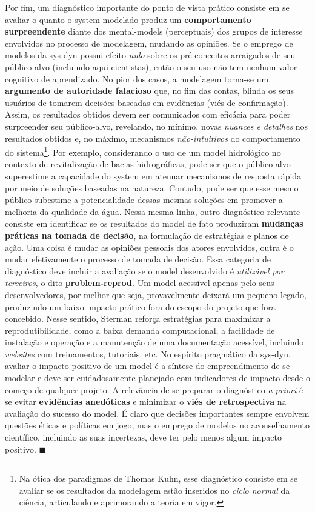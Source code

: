 \documentclass[./main.tex]{subfiles}
\begin{document}
\par Por fim, um diagnóstico importante do ponto de vista prático consiste em se avaliar o quanto o \gls{system} modelado produz um \textbf{comportamento surpreendente} diante dos \gls{mental-models} (perceptuais) dos grupos de interesse envolvidos no processo de modelagem, mudando as opiniões. Se o emprego de modelos da \gls{sys-dyn} possui efeito \textit{nulo} sobre os pré-conceitos arraigados de seu público-alvo (incluindo aqui cientistas), então o seu uso não tem nenhum valor cognitivo de aprendizado. No pior dos casos, a modelagem torna-se um \textbf{argumento de autoridade falacioso} que, no fim das contas, blinda os seus usuários de tomarem decisões baseadas em evidências (viés de confirmação). Assim, os resultados obtidos devem ser comunicados com eficácia para poder surpreender seu público-alvo, revelando, no mínimo, novas \textit{nuances e detalhes} nos resultados obtidos e, no máximo, mecanismos \textit{não-intuitivos} do comportamento do sistema\footnote{Na ótica dos paradigmas de Thomas Kuhn, esse diagnóstico consiste em se avaliar se os resultados da modelagem estão inseridos no \textit{ciclo normal} da ciência, articulando e aprimorando a \gls{teoria} em vigor.}. Por exemplo, considerando o uso de um \gls{model} hidrológico no contexto de revitalização de bacias hidrográficas, pode ser que o público-alvo superestime a capacidade do \gls{system} em atenuar mecanismos de resposta rápida por meio de soluções baseadas na natureza. Contudo, pode ser que esse mesmo público subestime a potencialidade dessas mesmas soluções em promover a melhoria da qualidade da água. Nessa mesma linha, outro diagnóstico relevante consiste em identificar se os resultados do \gls{model} de fato produziram \textbf{mudanças práticas na tomada de decisão}, na formulação de estratégias e planos de ação. Uma coisa é mudar as opiniões pessoais dos atores envolvidos, outra é o mudar efetivamente o processo de tomada de decisão. Essa categoria de diagnóstico deve incluir a avaliação se o \gls{model} desenvolvido é \textit{utilizável por terceiros}, o dito \textbf{\gls{problem-reprod}}.  Um \gls{model} acessível apenas pelo seus desenvolvedores, por melhor que seja, provavelmente deixará um pequeno legado, produzindo um baixo impacto prático fora do escopo do projeto que fora concebido. Nesse sentido, Sterman reforça estratégias para maximizar a reprodutibilidade, como a baixa demanda computacional, a facilidade de instalação e operação e a manutenção de uma documentação acessível, incluindo \textit{websites} com treinamentos, tutoriais, etc. No espírito pragmático da \gls{sys-dyn}, avaliar o impacto positivo de um \gls{model} é a síntese do empreendimento de se modelar e deve ser cuidadosamente planejado com indicadores de impacto desde o começo de qualquer projeto. A relevância de se preparar o diagnóstico \textit{a priori} é se evitar \textbf{evidências anedóticas} e minimizar o \textbf{viés de retrospectiva} na avaliação do sucesso do \gls{model}. É claro que decisões importantes sempre envolvem questões éticas e políticas em jogo, mas o emprego de modelos no aconselhamento científico, incluindo as suas incertezas, deve ter pelo menos algum impacto positivo. $\blacksquare$
\end{document}
